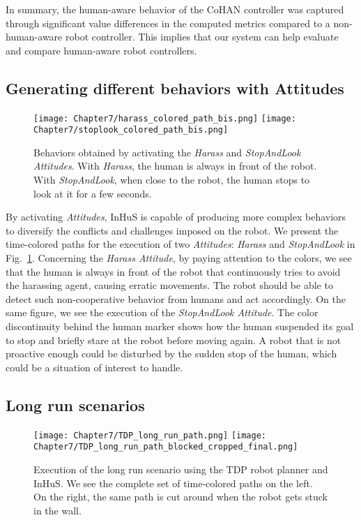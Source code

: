 In summary, the human-aware behavior of the CoHAN controller was captured through significant value differences in the computed metrics compared to a non-human-aware robot controller. This implies that our system can help evaluate and compare human-aware robot controllers.

\subsection{Generating different behaviors with Attitudes}

\begin{figure}
    \centering
    \texttt{[image: Chapter7/harass\_colored\_path\_bis.png]}
    \texttt{[image: Chapter7/stoplook\_colored\_path\_bis.png]}
    \caption{
    Behaviors obtained by activating the \textit{Harass} and \textit{StopAndLook Attitudes}. 
    With \textit{Harass}, the human is always in front of the robot.
    With \textit{StopAndLook}, when close to the robot, the human stops to look at it for a few seconds.
    }
    \label{fig:attitudes}
    \vspace{-0.3cm}
\end{figure}

By activating \textit{Attitudes}, InHuS is capable of producing more complex behaviors to diversify the conflicts and challenges imposed on the robot.
We present the time-colored paths for the execution of two \textit{Attitudes}: \textit{Harass} and \textit{StopAndLook} in Fig.~\ref{fig:attitudes}. Concerning the \textit{Harass Attitude}, by paying attention to the colors, we see that the human is always in front of the robot that continuously tries to avoid the harassing agent, causing erratic movements. The robot should be able to detect such non-cooperative behavior from humans and act accordingly.
On the same figure, we see the execution of the \textit{StopAndLook Attitude}. The color discontinuity behind the human marker shows how the human suspended its goal to stop and briefly stare at the robot before moving again. A robot that is not proactive enough could be disturbed by the sudden stop of the human, which could be a situation of interest to handle. 


\subsection{Long run scenarios}


\begin{figure}
    \centering
    \texttt{[image: Chapter7/TDP\_long\_run\_path.png]}
    \texttt{[image: Chapter7/TDP\_long\_run\_path\_blocked\_cropped\_final.png]}
    \caption{Execution of the long run scenario using the TDP robot planner and InHuS. We see the complete set of time-colored paths on the left. On the right, the same path is cut around when the robot gets stuck in the wall. 
    }
    \label{fig:long_run_block}
    \vspace{-0.3cm}
\end{figure}

